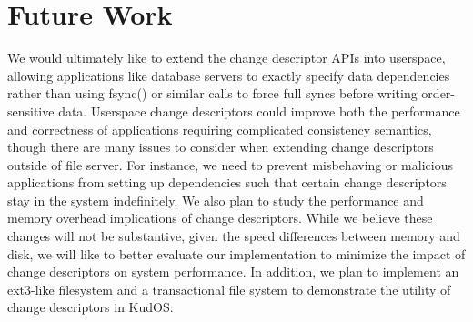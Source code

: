 \preparagraphspacing{}
\section*{Future Work}
\label{sec:future}

We would ultimately like to extend the change descriptor APIs into
userspace, allowing applications like database servers to exactly
specify data dependencies rather than using fsync() or similar calls
to force full syncs before writing order-sensitive data. Userspace
change descriptors could improve both the performance and correctness
of applications requiring complicated consistency semantics, though
there are many issues to consider when extending change descriptors
outside of file server. For instance, we need to prevent misbehaving
or malicious applications from setting up dependencies such that
certain change descriptors stay in the system indefinitely. We also
plan to study the performance and memory overhead implications of
change descriptors. While we believe these changes will not be
substantive, given the speed differences between memory and disk,
we will like to better evaluate our implementation to minimize the
impact of change descriptors on system performance. In addition, we
plan to implement an ext3-like filesystem and a transactional file
system to demonstrate the utility of change descriptors in KudOS.
